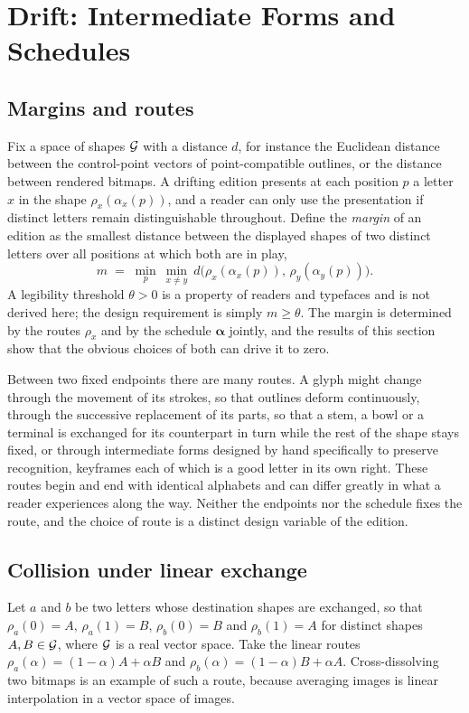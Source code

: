 \section{Drift: Intermediate Forms and Schedules}\label{sec:drift}

\subsection{Margins and routes}

Fix a space of shapes $\mathcal{G}$ with a distance $d$, for instance the Euclidean distance between the control-point vectors of point-compatible outlines, or the distance between rendered bitmaps. A drifting edition presents at each position $p$ a letter $x$ in the shape $\rho_x(\alpha_x(p))$, and a reader can only use the presentation if distinct letters remain distinguishable throughout. Define the \emph{margin} of an edition as the smallest distance between the displayed shapes of two distinct letters over all positions at which both are in play,
\[
m \;=\; \min_{p}\ \min_{x\neq y}\ d\bigl(\rho_x(\alpha_x(p)),\,\rho_y(\alpha_y(p))\bigr).
\]
A legibility threshold $\theta>0$ is a property of readers and typefaces and is not derived here; the design requirement is simply $m\ge\theta$. The margin is determined by the routes $\rho_x$ and by the schedule $\boldsymbol\alpha$ jointly, and the results of this section show that the obvious choices of both can drive it to zero.

Between two fixed endpoints there are many routes. A glyph might change through the movement of its strokes, so that outlines deform continuously, through the successive replacement of its parts, so that a stem, a bowl or a terminal is exchanged for its counterpart in turn while the rest of the shape stays fixed, or through intermediate forms designed by hand specifically to preserve recognition, keyframes each of which is a good letter in its own right. These routes begin and end with identical alphabets and can differ greatly in what a reader experiences along the way. Neither the endpoints nor the schedule fixes the route, and the choice of route is a distinct design variable of the edition.

\subsection{Collision under linear exchange}

Let $a$ and $b$ be two letters whose destination shapes are exchanged, so that $\rho_a(0)=A$, $\rho_a(1)=B$, $\rho_b(0)=B$ and $\rho_b(1)=A$ for distinct shapes $A,B\in\mathcal{G}$, where $\mathcal{G}$ is a real vector space. Take the linear routes $\rho_a(\alpha)=(1-\alpha)A+\alpha B$ and $\rho_b(\alpha)=(1-\alpha)B+\alpha A$. Cross-dissolving two bitmaps is an example of such a route, because averaging images is linear interpolation in a vector space of images.

